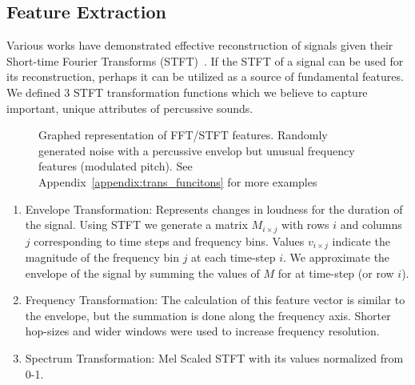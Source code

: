 \documentclass[runningheads,a4paper]{llncs}
\begin{document}
\subsection{Feature Extraction}
Various works have demonstrated effective reconstruction of signals given their Short-time Fourier Transforms (STFT)~\cite{nawab1983signal,griffin1984signal}. If the STFT of a signal can be used for its reconstruction, perhaps it can be utilized as a source of fundamental features. We defined 3 STFT transformation functions which we believe to capture important, unique attributes of percussive sounds. 
\begin{figure}[tbp]
\begin{center}
\caption{Graphed representation of FFT/STFT features. Randomly generated noise with a percussive envelop but unusual frequency features (modulated pitch). See Appendix~\ref{appendix:trans_funcitons} for more examples }
\label{fig:stackspectrums}
    \end{center}
\end{figure}
\begin{enumerate}
\item Envelope Transformation: Represents changes in loudness for the duration of the signal. Using STFT we generate a matrix $M_{i \times j}$ with rows $i$ and columns $j$ corresponding to time steps and frequency bins. Values $v_{i \times j}$ indicate the magnitude of the frequency bin $j$ at each time-step $i$. We approximate the envelope of the signal by summing the values of $M$ for at time-step (or row $i$). 
\item Frequency Transformation:  The calculation of this feature vector is similar to the envelope, but the summation is done along the frequency axis. Shorter hop-sizes and wider windows were used to increase frequency resolution. 
\item Spectrum Transformation: Mel Scaled STFT with its values normalized from 0-1. 
\end{enumerate}
\end{document}
